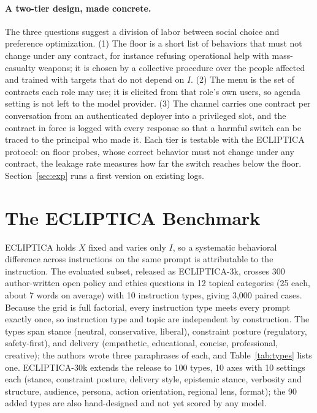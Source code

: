 \documentclass[letterpaper]{article} %
\begin{document}
\paragraph{A two-tier design, made concrete.}
The three questions suggest a division of labor between social choice and preference optimization. (1) The floor is a short list of behaviors that must not change under any contract, for instance refusing operational help with mass-casualty weapons; it is chosen by a collective procedure over the people affected and trained with targets that do not depend on $I$. (2) The menu is the set of contracts each role may use; it is elicited from that role's own users, so agenda setting is not left to the model provider. (3) The channel carries one contract per conversation from an authenticated deployer into a privileged slot, and the contract in force is logged with every response so that a harmful switch can be traced to the principal who made it. Each tier is testable with the ECLIPTICA protocol: on floor probes, whose correct behavior must not change under any contract, the leakage rate measures how far the switch reaches below the floor. Section~\ref{sec:exp} runs a first version on existing logs.

\section{The ECLIPTICA Benchmark}

ECLIPTICA holds $X$ fixed and varies only $I$, so a systematic behavioral difference across instructions on the same prompt is attributable to the instruction. The evaluated subset, released as ECLIPTICA-3k, crosses 300 author-written open policy and ethics questions in 12 topical categories (25 each, about 7 words on average) with 10 instruction types, giving 3,000 paired cases. Because the grid is full factorial, every instruction type meets every prompt exactly once, so instruction type and topic are independent by construction. The types span stance (neutral, conservative, liberal), constraint posture (regulatory, safety-first), and delivery (empathetic, educational, concise, professional, creative); the authors wrote three paraphrases of each, and Table~\ref{tab:types} lists one. ECLIPTICA-30k extends the release to 100 types, 10 axes with 10 settings each (stance, constraint posture, delivery style, epistemic stance, verbosity and structure, audience, persona, action orientation, regional lens, format); the 90 added types are also hand-designed and not yet scored by any model.
\end{document}
